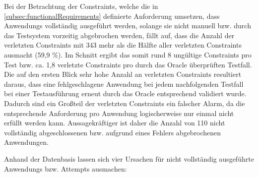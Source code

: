 Bei der Betrachtung der Constraints, welche die in \cref{subsec:functionalRequirements} definierte Anforderung umsetzen, dass \glspl{Anwendung} vollständig ausgeführt werden, solange sie nicht manuell bzw. durch das Testsystem vorzeitig abgebrochen werden, fällt auf, dass die Anzahl der verletzten Constraints mit 343 mehr als die Hälfte aller verletzten Constraints ausmacht (59,9 \%).
Im Schnitt ergibt das somit rund 8 ungültige Constraints pro \gls{Test} bzw. ca. 1,8 verletzte Constraints pro durch das Oracle überprüften Testfall.
Die auf den ersten Blick sehr hohe Anzahl an verletzten Constraints resultiert daraus, dass eine fehlgeschlagene \gls{Anwendung} bei jedem nachfolgenden \gls{Testfall} bei einer Testausführung erneut durch das Oracle entsprechend validiert wurde.
Dadurch sind ein Großteil der verletzten Constraints ein falscher Alarm, da die entsprechende Anforderung pro \gls{Anwendung} logischerweise nur einmal nicht erfüllt werden kann.
Aussagekräftiger ist daher die Anzahl von 110 nicht vollständig abgeschlossenen bzw. aufgrund eines Fehlers abgebrochenen Anwendungen.

Anhand der Datenbasis lassen sich vier Ursachen für nicht vollständig ausgeführte \glspl{Anwendung} bzw. Attempts ausmachen:

